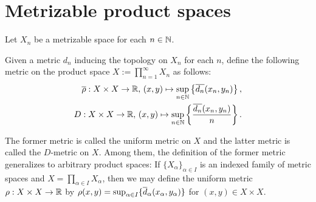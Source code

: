 \section{Metrizable product spaces}

Let $X_n$ be a metrizable space for each $n\in{\mathbb{N}}$.

\begin{nota}
    Given a metric $d_n$ inducing the topology on $X_n$ for each $n$,
    define the following metric on the product space $X:=\prod_{n=1}^\infty X_n$ as follows:
    \begin{align*}
        \overline{\rho}: X\times X\rightarrow{\mathbb{R}},\,(x, y)\mapsto\sup_{n\in{\mathbb{N}}}\left\{\overline{d_n}(x_n, y_n)\right\},\\
        D: X\times X\rightarrow{\mathbb{R}},\,(x, y)\mapsto\sup_{n\in{\mathbb{N}}}\left\{\frac{\overline{d_n}(x_n, y_n)}{n}\right\}.
    \end{align*}
\end{nota}

The former metric is called the uniform metric on $X$ and the latter metric is called the $D$-metric on $X$.
Among them, the definition of the former metric generalizes to arbitrary product spaces: If $\{X_\alpha\}_{\alpha\in I}$ is an indexed family of metric spaces and $X=\prod_{\alpha\in I} X_\alpha$, then we may define the uniform metric $\rho: X\times X\rightarrow {\mathbb{R}}$ by $\rho(x, y)=\sup_{\alpha\in I}\{\overline{d}_\alpha(x_\alpha, y_\alpha)\}$ for $(x, y)\in X\times X$.

